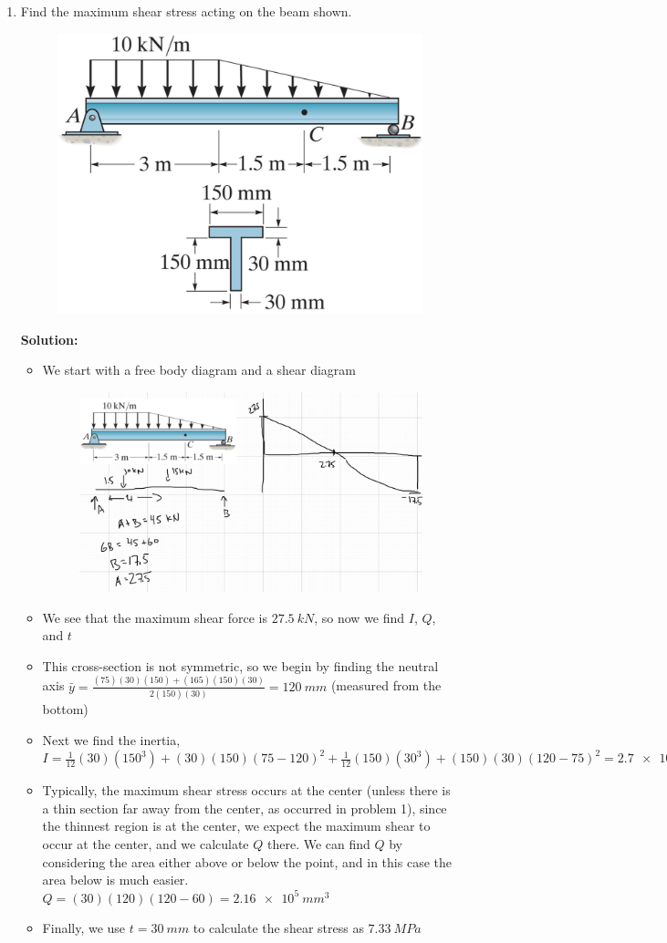 \documentclass[12pt, oneside]{article}
\begin{document}
\begin{enumerate}
	\item %
		Find the maximum shear stress acting on the beam shown.
		\begin{figure}[H]
			\centering
			\includegraphics[width=0.6\linewidth]{7-25}
		\end{figure}
			\textbf{Solution:}
			\begin{itemize}
				\item We start with a free body diagram and a shear diagram
					\begin{figure}[H]
						\centering
						\includegraphics[width=0.8\linewidth]{6-2}
					\end{figure}
				\item We see that the maximum shear force is $ \SI{27.5 }{kN} $, so now we find $I$, $Q$, and $t$
				\item This cross-section is not symmetric, so we begin by finding the neutral axis $\bar{y} = \frac{(75)(30)(150)+(165)(150)(30)}{2(150)(30)} = 	\SI{120}{mm} $ (measured from the bottom)
				\item Next we find the inertia, $I = \frac{1}{12}(30)(150^3) + (30)(150)(75-120)^2 + \frac{1}{12}(150)(30^3) + (150)(30)(120-75)^2 = 	\SI{2.7e7}{mm^4} $
				\item Typically, the maximum shear stress occurs at the center (unless there is a thin section far away from the center, as occurred in problem 1), since the thinnest region is at the center, we expect the maximum shear to occur at the center, and we calculate $Q$ there.
					We can find $Q$ by considering the area either above or below the point, and in this case the area below is much easier.
					$Q = (30)(120)(120-60) = 	\SI{2.16e5}{mm^3} $
				\item Finally, we use $t= 	\SI{30 }{mm} $ to calculate the shear stress as $ 	\SI{7.33}{MPa}  $
			\end{itemize}


\end{enumerate}
\end{document}
